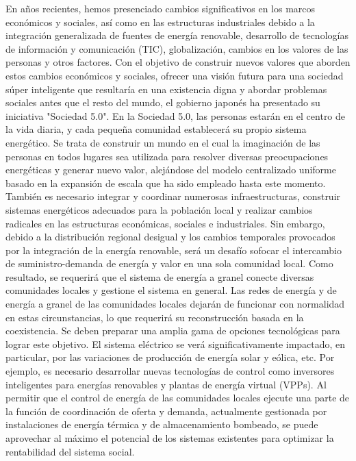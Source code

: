 \documentclass[crop=false]{standalone}
\begin{document}
En años recientes, hemos presenciado cambios significativos en los marcos económicos y sociales, así como en las estructuras industriales debido a la integración generalizada de fuentes de energía renovable, desarrollo de tecnologías de información y comunicación (TIC), globalización, cambios en los valores de las personas y otros factores. Con el objetivo de construir nuevos valores que aborden estos cambios económicos y sociales, ofrecer una visión futura para una sociedad súper inteligente que resultaría en una existencia digna y abordar problemas sociales antes que el resto del mundo, el gobierno japonés ha presentado su iniciativa "Sociedad 5.0".
En la Sociedad 5.0, las personas estarán en el centro de la vida diaria, y cada pequeña comunidad establecerá su propio sistema energético. Se trata de construir un mundo en el cual la imaginación de las personas en todos lugares sea utilizada para resolver diversas preocupaciones energéticas y generar nuevo valor, alejándose del modelo centralizado uniforme basado en la expansión de escala que ha sido empleado hasta este momento.
También es necesario integrar y coordinar numerosas infraestructuras, construir sistemas energéticos adecuados para la población local y realizar cambios radicales en las estructuras económicas, sociales e industriales. Sin embargo, debido a la distribución regional desigual y los cambios temporales provocados por la integración de la energía renovable, será un desafío sofocar el intercambio de suministro-demanda de energía y valor en una sola comunidad local. Como resultado, se requerirá que el sistema de energía a granel conecte diversas comunidades locales y gestione el sistema en general.
Las redes de energía y de energía a granel de las comunidades locales dejarán de funcionar con normalidad en estas circunstancias, lo que requerirá su reconstrucción basada en la coexistencia. Se deben preparar una amplia gama de opciones tecnológicas para lograr este objetivo. El sistema eléctrico se verá significativamente impactado, en particular, por las variaciones de producción de energía solar y eólica, etc. Por ejemplo, es necesario desarrollar nuevas tecnologías de control como inversores inteligentes para energías renovables y plantas de energía virtual (VPPs).
Al permitir que el control de energía de las comunidades locales ejecute una parte de la función de coordinación de oferta y demanda, actualmente gestionada por instalaciones de energía térmica y de almacenamiento bombeado, se puede aprovechar al máximo el potencial de los sistemas existentes para optimizar la rentabilidad del sistema social.
\end{document}
